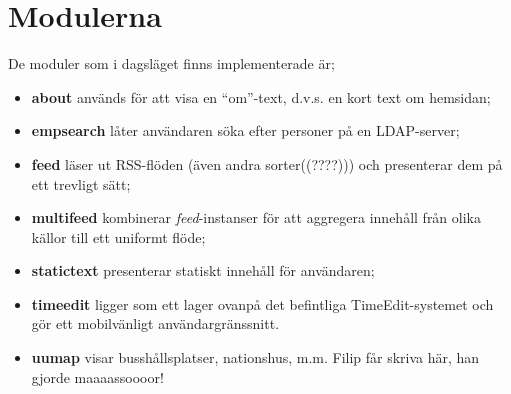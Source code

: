 \section{Modulerna}
De moduler som i dagsläget finns implementerade är;

\begin{itemize}
  \item {\bf about} används för att visa en ``om''-text, d.v.s. en kort
    text om hemsidan;
  \item {\bf empsearch} låter användaren söka efter personer på en
    LDAP-server;
  \item {\bf feed} läser ut RSS-flöden (även andra sorter((????))) och
    presenterar dem på ett trevligt sätt;
  \item {\bf multifeed} kombinerar \emph{feed}-instanser för att
    aggregera innehåll från olika källor till ett uniformt flöde;

  \item {\bf statictext} presenterar statiskt innehåll för användaren;

  \item {\bf timeedit} ligger som ett lager ovanpå det befintliga
    TimeEdit-systemet och gör ett mobilvänligt användargränssnitt.

  \item {\bf uumap} visar busshållsplatser, nationshus, m.m. Filip får
    skriva här, han gjorde maaaassoooor!
\end{itemize}

%
%
%
%
%

%

